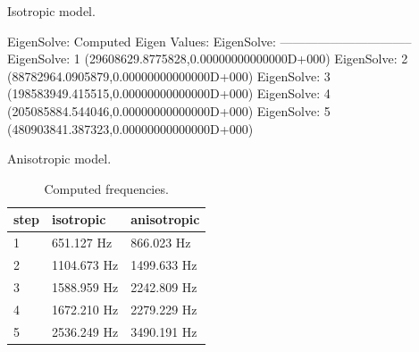 \ttend
\begin{center}
Isotropic model.
\end{center}
\ttbegin
EigenSolve: Computed Eigen Values:
EigenSolve: --------------------------------
EigenSolve:            1        (29608629.8775828,0.00000000000000D+000)
EigenSolve:            2        (88782964.0905879,0.00000000000000D+000)
EigenSolve:            3        (198583949.415515,0.00000000000000D+000)
EigenSolve:            4        (205085884.544046,0.00000000000000D+000)
EigenSolve:            5        (480903841.387323,0.00000000000000D+000)
\ttend
\begin{center}
Anisotropic model.
\end{center}
\begin{table}[h]
\caption{Computed frequencies.}
\label{tb:freq}
\begin{center}
\begin{tabular}{lll} \hline
step  & isotropic & anisotropic\\ \hline
1 & 651.127 Hz  & 866.023 Hz\\
2 & 1104.673 Hz & 1499.633 Hz\\
3 & 1588.959 Hz & 2242.809 Hz\\
4 & 1672.210 Hz & 2279.229 Hz      \\
5 & 2536.249 Hz & 3490.191 Hz    \\ \hline
\end{tabular}
\end{center}
\end{table}


